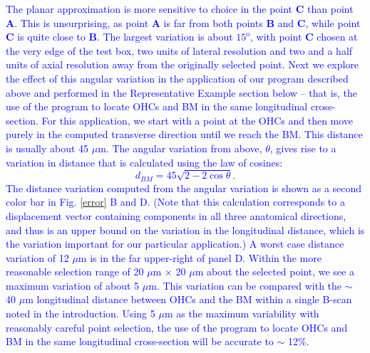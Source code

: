 \documentclass[preprint,NumberedRefs]{JASA}
\begin{document}
\par{\textcolor{blue}{The planar approximation is more sensitive to choice in the point $\mathbf{C}$ than point $\mathbf{A}$. This is unsurprising, as point $\mathbf{A}$ is far from both points $\mathbf{B}$ and $\mathbf{C}$, while point $\mathbf{C}$ is quite close to $\mathbf{B}$. The largest variation is about $15^\text{o}$, with point $\mathbf{C}$ chosen at the very edge of the test box, two units of lateral resolution and two and a half units of axial resolution away from the originally selected point. Next we explore the effect of this angular variation in the application of our program described above and performed in the Representative Example section below -- that is, the use of the program to locate OHCs and BM in the same longitudinal cross-section. For this application, we start with a point at the OHCs and then move purely in the computed transverse direction until we reach the BM. This distance is usually about 45 $\mu$m. %
The angular variation from above, $\theta$, gives rise to a variation in distance that is calculated using the law of cosines:
\begin{equation}
    d_{BM} = 45\sqrt{2-2\cos\theta}.
\end{equation}
The distance variation computed from the angular variation is shown as a second color bar in Fig. \ref{error} B and D. (Note that this calculation corresponds to a displacement vector containing components in all three anatomical directions, and thus is an upper bound on the variation in the longitudinal distance, which is the variation important for our particular application.) A worst case distance variation of 12 $\mu$m is in the far upper-right of panel D. Within the more reasonable selection range of 20 $\mu$m $\times$ 20 $\mu$m about the selected point, we see a maximum variation of about 5 $\mu$m. This variation can be compared with the $\sim$ 40  $\mu$m longitudinal distance between OHCs and the BM within a single B-scan noted in the introduction.  Using 5 $\mu$m as the maximum variability with reasonably careful point selection, the use of the program to locate OHCs and BM in the same longitudinal cross-section will be accurate to $\sim$ 12\%.}} %
\end{document}
